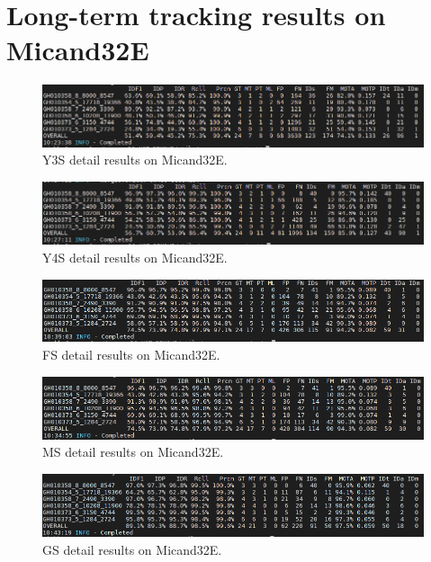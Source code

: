 \section{Long-term tracking results on Micand32E}
\begin{figure}
	\centerline{\includegraphics[width=1\linewidth]{Figs/Evaluation/micand6/y3s.png}}
	\caption{Y3S detail results on Micand32E.}
\end{figure}
\begin{figure}
	\centerline{\includegraphics[width=1\linewidth]{Figs/Evaluation/micand6/y4s.png}}
	\caption{Y4S detail results on Micand32E.}
\end{figure}
\begin{figure}
	\centerline{\includegraphics[width=1\linewidth]{Figs/Evaluation/micand6/fs.png}}
	\caption{FS detail results on Micand32E.}
\end{figure}
\begin{figure}
	\centerline{\includegraphics[width=1\linewidth]{Figs/Evaluation/micand6/ms.png}}
	\caption{MS detail results on Micand32E.}
\end{figure}
\begin{figure}
	\centerline{\includegraphics[width=1\linewidth]{Figs/Evaluation/micand6/gs.png}}
	\caption{GS detail results on Micand32E.}
\end{figure}
